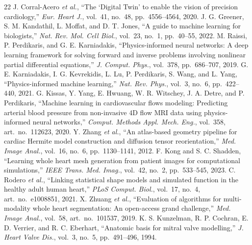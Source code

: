 \documentclass[journal]{IEEEtran}
\begin{document}




\begin{thebibliography}{22}
 J. Corral-Acero \emph{et al.}, ``The `Digital Twin' to enable the vision of precision cardiology,'' \emph{Eur. Heart J.}, vol.~41, no.~48, pp.~4556--4564, 2020.
 J. G. Greener, S. M. Kandathil, L. Moffat, and D. T. Jones, ``A guide to machine learning for biologists,'' \emph{Nat. Rev. Mol. Cell Biol.}, vol.~23, no.~1, pp.~40--55, 2022.
 M. Raissi, P. Perdikaris, and G. E. Karniadakis, ``Physics-informed neural networks: A deep learning framework for solving forward and inverse problems involving nonlinear partial differential equations,'' \emph{J. Comput. Phys.}, vol.~378, pp.~686--707, 2019.
 G. E. Karniadakis, I. G. Kevrekidis, L. Lu, P. Perdikaris, S. Wang, and L. Yang, ``Physics-informed machine learning,'' \emph{Nat. Rev. Phys.}, vol.~3, no.~6, pp.~422--440, 2021.
 G. Kissas, Y. Yang, E. Hwuang, W. R. Witschey, J. A. Detre, and P. Perdikaris, ``Machine learning in cardiovascular flows modeling: Predicting arterial blood pressure from non-invasive 4D flow MRI data using physics-informed neural networks,'' \emph{Comput. Methods Appl. Mech. Eng.}, vol.~358, art.~no.~112623, 2020.
 Y. Zhang \emph{et al.}, ``An atlas-based geometry pipeline for cardiac Hermite model construction and diffusion tensor reorientation,'' \emph{Med. Image Anal.}, vol.~16, no.~6, pp.~1130--1141, 2012.
 F. Kong and S. C. Shadden, ``Learning whole heart mesh generation from patient images for computational simulations,'' \emph{IEEE Trans. Med. Imag.}, vol.~42, no.~2, pp.~533--545, 2023.
 C. Rodero \emph{et al.}, ``Linking statistical shape models and simulated function in the healthy adult human heart,'' \emph{PLoS Comput. Biol.}, vol.~17, no.~4, art.~no.~e1008851, 2021.
 X. Zhuang \emph{et al.}, ``Evaluation of algorithms for multi-modality whole heart segmentation: An open-access grand challenge,'' \emph{Med. Image Anal.}, vol.~58, art.~no.~101537, 2019.
 K. S. Kunzelman, R. P. Cochran, E. D. Verrier, and R. C. Eberhart, ``Anatomic basis for mitral valve modelling,'' \emph{J. Heart Valve Dis.}, vol.~3, no.~5, pp.~491--496, 1994.

\end{thebibliography}
\end{document}
